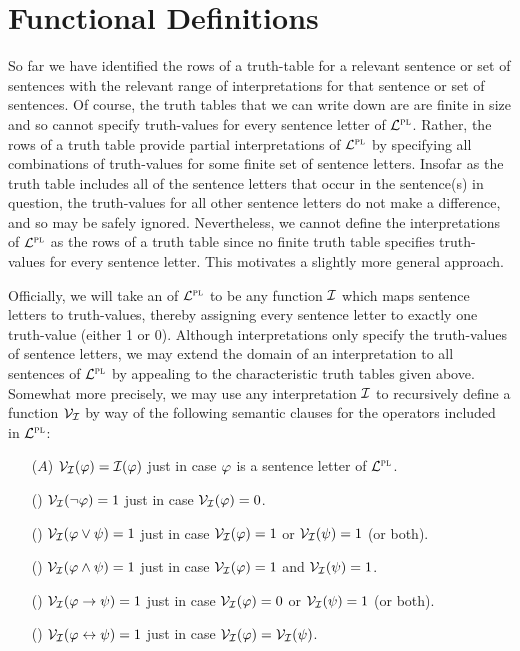 
\section{Functional Definitions}%
  \label{sec:Functional}


So far we have identified the rows of a truth-table for a relevant sentence or set of sentences with the relevant range of interpretations for that sentence or set of sentences.
Of course, the truth tables that we can write down are are finite in size and so cannot specify truth-values for every sentence letter of $\mathcal{L}^{\textsc{pl}}$.
Rather, the rows of a truth table provide partial interpretations of $\mathcal{L}^{\textsc{pl}}$ by specifying all combinations of truth-values for some finite set of sentence letters.
Insofar as the truth table includes all of the sentence letters that occur in the sentence(s) in question, the truth-values for all other sentence letters do not make a difference, and so may be safely ignored.
Nevertheless, we cannot define the interpretations of $\mathcal{L}^{\textsc{pl}}$ as the rows of a truth table since no finite truth table specifies truth-values for every sentence letter.
This motivates a slightly more general approach.

Officially, we will take an  of $\mathcal{L}^{\textsc{pl}}$ to be any function $\mathcal{I}$ which maps sentence letters to truth-values, thereby assigning every sentence letter to exactly one truth-value (either 1 or 0).
Although interpretations only specify the truth-values of sentence letters, we may extend the domain of an interpretation to all sentences of $\mathcal{L}^{\textsc{pl}}$ by appealing to the characteristic truth tables given above.
Somewhat more precisely, we may use any interpretation $\mathcal{I}$ to recursively define a  function $\mathcal{V}_{\mathcal{I}}$ by way of the following semantic clauses for the operators included in $\mathcal{L}^{\textsc{pl}}$:

\begin{enumerate}[labelsep=.15in]
  \item[($A$)] $\mathcal{V}_{\mathcal{I}}(\varphi)=\mathcal{I}(\varphi)$ just in case $\varphi$ is a sentence letter of $\mathcal{L}^{\textsc{pl}}$.
  \item[(\enot)] $\mathcal{V}_{\mathcal{I}}(\neg\varphi)=1$ just in case $\mathcal{V}_{\mathcal{I}}(\varphi)=0$.
  \item[(\eor)] $\mathcal{V}_{\mathcal{I}}(\varphi \vee \psi)=1$ just in case $\mathcal{V}_{\mathcal{I}}(\varphi)=1$ or $\mathcal{V}_{\mathcal{I}}(\psi)=1$ (or both).
  \item[(\eand)] $\mathcal{V}_{\mathcal{I}}(\varphi \wedge \psi)=1$ just in case $\mathcal{V}_{\mathcal{I}}(\varphi)=1$ and $\mathcal{V}_{\mathcal{I}}(\psi)=1$.
  \item[(\eif)] $\mathcal{V}_{\mathcal{I}}(\varphi \rightarrow \psi)=1$ just in case $\mathcal{V}_{\mathcal{I}}(\varphi)=0$ or $\mathcal{V}_{\mathcal{I}}(\psi)=1$ (or both).
  \item[(\eiff)] $\mathcal{V}_{\mathcal{I}}(\varphi \leftrightarrow \psi)=1$ just in case $\mathcal{V}_{\mathcal{I}}(\varphi)=\mathcal{V}_{\mathcal{I}}(\psi)$.
\end{enumerate}

